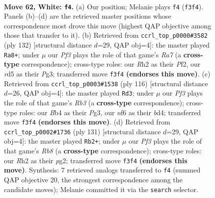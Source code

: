 \documentclass[11pt]{article}
\begin{document}
\clearpage

\begin{figure}[p]\centering
\begin{subfigure}{0.46\textwidth}\centering
\resizebox{\linewidth}{!}{%
\newchessgame
\chessboard[
  setfen={6k1/5p2/5n2/3r4/pB5p/P3KP1P/7R/8 w - - 3 62},
  showmover=false,
  pgfstyle=straightmove, color=movearrow, markmove={f3-f4}
]}
\caption{}
\end{subfigure}\hfill
\begin{subfigure}{0.46\textwidth}\centering
\resizebox{\linewidth}{!}{%
\newchessgame
\chessboard[
  setfen={6k1/R7/2r2np1/5p2/5B1P/6PK/5P2/8 w - - 16 67},
  showmover=false,
  pgfstyle=straightmove, color=movearrow, markmove={a7-a8}
]}
\caption{}
\end{subfigure}
\\[4pt]
\begin{subfigure}{0.46\textwidth}\centering
\resizebox{\linewidth}{!}{%
\newchessgame
\chessboard[
  setfen={8/4p1k1/3p4/3n1Pp1/3b4/1R3PPK/8/8 w - - 0 59},
  showmover=false,
  pgfstyle=straightmove, color=movearrow, markmove={b3-d3}
]}
\caption{}
\end{subfigure}\hfill
\begin{subfigure}{0.46\textwidth}\centering
\resizebox{\linewidth}{!}{%
\newchessgame
\chessboard[
  setfen={8/8/2bkp2p/R6P/2P1p1N1/8/5KP1/1r6 b - - 14 66},
  showmover=false,
  pgfstyle=straightmove, color=movearrow, markmove={b1-b2}
]}
\caption{}
\end{subfigure}
\caption{\textbf{Move 62, White: \texttt{f4}.} (a) Our position; Melanie plays \texttt{f4} (\texttt{f3f4}). Panels (b)--(d) are the retrieved master positions whose correspondence most drove this move (highest QAP objective among those that transfer to it). (b) Retrieved from \texttt{ccrl\_top\_p0000\#3582} (ply 132) [structural distance $d$=29, QAP obj=4]: the master played \texttt{Ra8+}; under $\mu$ our \emph{Pf3} plays the role of that game's \emph{Ra7} (a \textbf{cross-type} correspondence); cross-type roles: our \emph{R}h2 as their \emph{P}f2, our \emph{r}d5 as their \emph{P}g3; transferred move \texttt{f3f4} \textbf{(endorses this move)}. (c) Retrieved from \texttt{ccrl\_top\_p0003\#1538} (ply 116) [structural distance $d$=26, QAP obj=4]: the master played \texttt{Rd3}; under $\mu$ our \emph{Pf3} plays the role of that game's \emph{Rb3} (a \textbf{cross-type} correspondence); cross-type roles: our \emph{B}b4 as their \emph{P}g3, our \emph{n}f6 as their \emph{b}d4; transferred move \texttt{f3f4} \textbf{(endorses this move)}. (d) Retrieved from \texttt{ccrl\_top\_p0002\#1736} (ply 131) [structural distance $d$=29, QAP obj=4]: the master played \texttt{Rb2+}; under $\mu$ our \emph{Pf3} plays the role of that game's \emph{Rb8} (a \textbf{cross-type} correspondence); cross-type roles: our \emph{R}h2 as their \emph{p}g2; transferred move \texttt{f3f4} \textbf{(endorses this move)}. Synthesis: 7 retrieved analogs transferred to \texttt{f4} (summed QAP objective 20, the strongest correspondence among the candidate moves); Melanie committed it via the \texttt{search} selector.}
\label{fig:thought-m122}
\end{figure}
\end{document}
